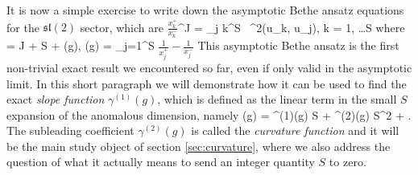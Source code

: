 It is now a simple exercise to write down the asymptotic Bethe ansatz equations for the $\mathfrak{sl}(2)$ sector, which are \cite{Arutyunov:2004vx}
\beq
	\label{eq:sl2_aba}
	\( \frac{x_k^+}{x_k^-} \)^J = \prod_{j \neq k}^S  \,  \; \sigma^2(u_k, u_j), \;\;\; k = 1, \dots S
\eeq
where 
\beq
	\Delta = J + S + \gamma(g), \;\;\; \gamma(g) =  \sum_{j=1}^S \( \frac{1}{x_j^+} - \frac{1}{x_j^-} \)
\eeq
This asymptotic Bethe ansatz  is the first non-trivial exact result we encountered so far, even if only valid in the asymptotic limit. In this short paragraph we will demonstrate how it can be used to find the exact \emph{slope function} $\gamma^{(1)}(g)$, which is defined as the linear term in the small $S$ expansion of the anomalous dimension, namely
\beq
	\label{eq:slope_definition}
	\gamma(g) = \gamma^{(1)}(g) \; S + \gamma^{(2)}(g) \; S^2 + .
\eeq
The subleading coefficient $\gamma^{(2)}(g)$ is called the \emph{curvature function} and it will be the main study object of section \ref{sec:curvature}, where we also address the question of what it actually means to send an integer quantity $S$ to zero. 

